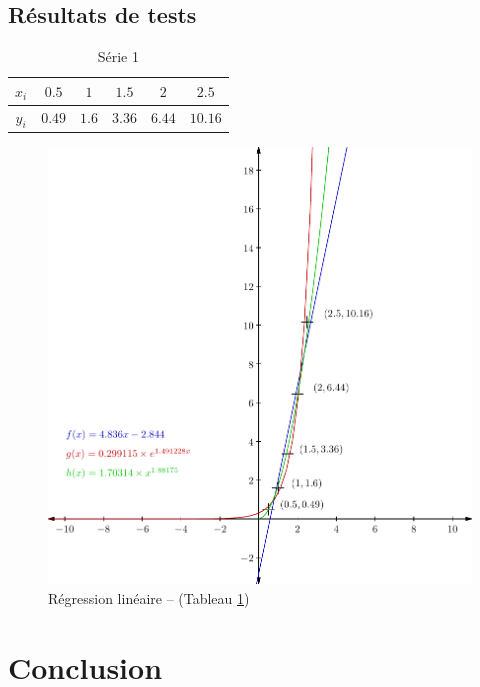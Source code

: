 \documentclass{report}
\begin{document}
    \section{Résultats de tests}
      \begin{table}[h]
	\centering
	\begin{tabular}{| c | c | c | c | c | c |}
	\hline 
	$x_{i}$ & $0.5$ & $1$ & $1.5$ & $2$ & $2.5$ \\ 
	\hline 
	$y_{i}$ & $0.49$ & $1.6$ & $3.36$ & $6.44$ & $10.16$ \\ 
	\hline 
	\end{tabular}
	\caption{Série 1}
	\label{approx_td3_ex6}
      \end{table}
      \begin{figure}[h]
	\centering
	\includegraphics{graphiques/pdf_output/reglin.pdf}
	\caption{Régression linéaire -- (Tableau \ref{approx_td3_ex6})}
      \end{figure}
  \chapter{Conclusion}
\end{document}
